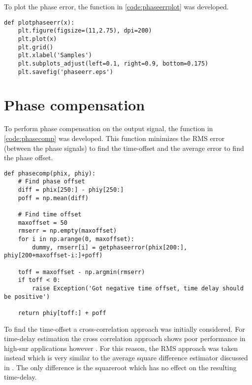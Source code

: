 To plot the phase error, the function in \cref{code:phaseerrplot} was developed.
\lstset{language=python,caption=Function for plotting phase errors,label=code:phaseerrplot}
\begin{lstlisting}
def plotphaseerr(x):
    plt.figure(figsize=(11,2.75), dpi=200)  
    plt.plot(x)
    plt.grid()
    plt.xlabel('Samples')
    plt.subplots_adjust(left=0.1, right=0.9, bottom=0.175)
    plt.savefig('phaseerr.eps')  
\end{lstlisting}


\section{Phase compensation}
To perform phase compensation on the output signal, the function in \cref{code:phasecomp} was developed. This function minimizes the RMS error (between the phase signals) to find the time-offset and the average error to find the phase offset.\\

\lstset{language=python,caption=Function for performing phase compensation,label=code:phasecomp}
\begin{lstlisting}
def phasecomp(phix, phiy):
    # Find phase offset
    diff = phix[250:] - phiy[250:]
    poff = np.mean(diff)

    # Find time offset
    maxoffset = 50
    rmserr = np.empty(maxoffset)
    for i in np.arange(0, maxoffset):
        dummy, rmserr[i] = getphaseerror(phix[200:], phiy[200+maxoffset-i:]+poff)

    toff = maxoffset - np.argmin(rmserr)
    if toff < 0:
        raise Exception('Got negative time offset, time delay should be positive')

    return phiy[toff:] + poff
\end{lstlisting}

To find the time-offset a cross-correlation approach was initially considered. For time-delay estimation the cross correlation approach shows poor performance in high-snr applications however \cite{193195}. For this reason, the RMS approach was taken instead which is very similar to the average square difference estimator discussed in \cite{193195}. The only difference is the squareroot which has no effect on the resulting time-delay.

